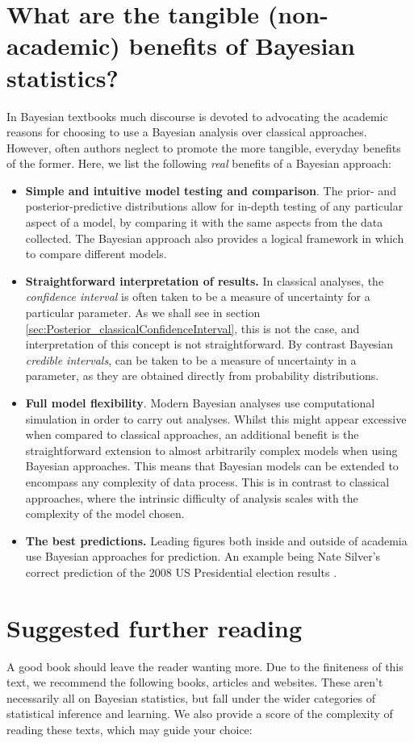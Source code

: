 \documentclass[11pt,fullpage]{book}
\begin{document}
\section{What are the tangible (non-academic) benefits of Bayesian statistics?}
In Bayesian textbooks much discourse is devoted to advocating the academic reasons for choosing to use a Bayesian analysis over classical approaches. However, often authors neglect to promote the more tangible, everyday benefits of the former. Here, we list the following \textit{real} benefits of a Bayesian approach:

\begin{itemize}
\item \textbf{Simple and intuitive model testing and comparison}. The prior- and posterior-predictive distributions allow for in-depth testing of any particular aspect of a model, by comparing it with the same aspects from the data collected. The Bayesian approach also provides a logical framework in which to compare different models.
\item \textbf{Straightforward interpretation of results.} In classical analyses, the \textit{confidence interval} is often taken to be a measure of uncertainty for a particular parameter. As we shall see in section \ref{sec:Posterior_classicalConfidenceInterval}, this is not the case, and interpretation of this concept is not straightforward. By contrast Bayesian \textit{credible intervals}, can be taken to be a measure of uncertainty in a parameter, as they are obtained directly from probability distributions.
\item \textbf{Full model flexibility}. Modern Bayesian analyses use computational simulation in order to carry out analyses. Whilst this might appear excessive when compared to classical approaches, an additional benefit is the straightforward extension to almost arbitrarily complex models when using Bayesian approaches. This means that Bayesian models can be extended to encompass any complexity of data process. This is in contrast to classical approaches, where the intrinsic difficulty of analysis scales with the complexity of the model chosen.
\item \textbf{The best predictions.} Leading figures both inside and outside of academia use Bayesian approaches for prediction. An example being Nate Silver's correct prediction of the 2008 US Presidential election results \cite{silver2012signal}.
\end{itemize}

\section{Suggested further reading}
A good book should leave the reader wanting more. Due to the finiteness of this text, we recommend the following books, articles and websites. These aren't necessarily all on Bayesian statistics, but fall under the wider categories of statistical inference and learning. We also provide a score of the complexity of reading these texts, which may guide your choice:
\end{document}
